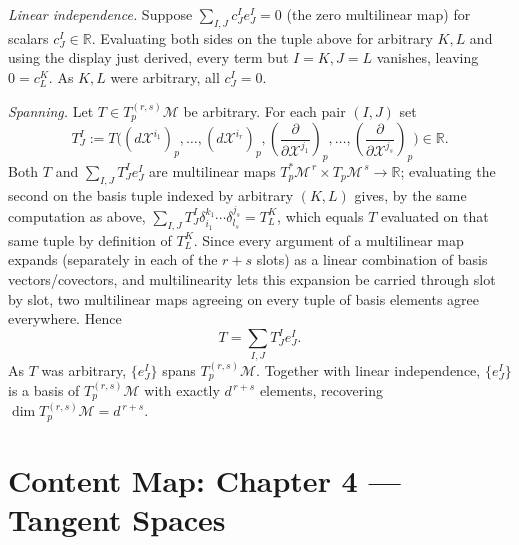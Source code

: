 \documentclass[11pt]{article}
\newcommand{\TpM}{T_p\mathcal M}
\newcommand{\TpsM}{T_p^*\mathcal M}
\newcommand{\TprsM}{T_p^{(r,s)}\mathcal M}
\begin{document}
\emph{Linear independence.} Suppose $\sum_{I,J}c^I_Je^I_J=0$ (the zero
multilinear map) for scalars $c^I_J\in\mathbb R$. Evaluating both sides on
the tuple above for arbitrary $K,L$ and using the display just derived,
every term but $I=K,J=L$ vanishes, leaving $0=c^K_L$. As $K,L$ were
arbitrary, all $c^I_J=0$.

\emph{Spanning.} Let $T\in\TprsM$ be arbitrary. For each pair $(I,J)$ set
\[
T^I_J := T\big((d\mathcal X^{i_1})_p,\dots,(d\mathcal X^{i_r})_p,\left(\frac{\partial}{\partial\mathcal X^{j_1}}\right)_p,\dots,\left(\frac{\partial}{\partial\mathcal X^{j_s}}\right)_p\big)\in\mathbb R.
\]
Both $T$ and $\sum_{I,J}T^I_Je^I_J$ are multilinear maps
$\TpsM^{\,r}\times\TpM^{\,s}\to\mathbb R$; evaluating the second on the
basis tuple indexed by arbitrary $(K,L)$ gives, by the same computation as
above, $\sum_{I,J}T^I_J\delta^{k_1}_{i_1}\cdots\delta^{j_s}_{l_s}=T^K_L$,
which equals $T$ evaluated on that same tuple by definition of $T^K_L$.
Since every argument of a multilinear map expands (separately in each of
the $r+s$ slots) as a linear combination of basis vectors/covectors, and
multilinearity lets this expansion be carried through slot by slot, two
multilinear maps agreeing on every tuple of basis elements agree
everywhere. Hence
\[
T = \sum_{I,J}T^I_Je^I_J.
\]
As $T$ was arbitrary, $\{e^I_J\}$ spans $\TprsM$. Together with linear
independence, $\{e^I_J\}$ is a basis of $\TprsM$ with exactly $d^{\,r+s}$
elements, recovering $\dim\TprsM=d^{\,r+s}$.


\clearpage
\section*{Content Map: Chapter 4 --- Tangent Spaces}
\end{document}
